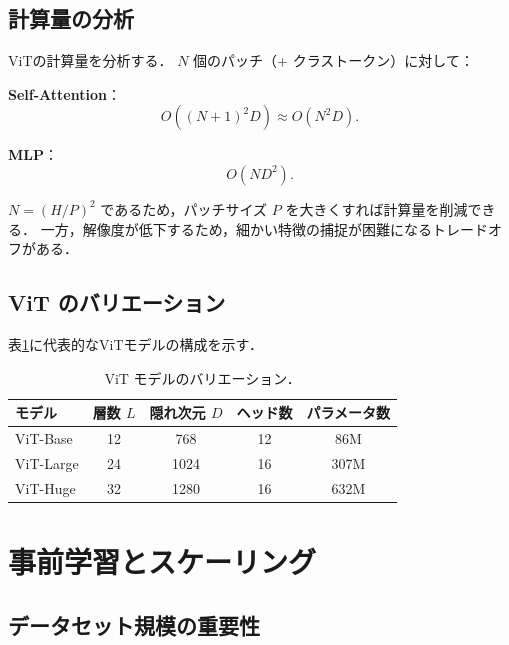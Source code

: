 \subsection{計算量の分析}

ViTの計算量を分析する．
$N$ 個のパッチ（+ クラストークン）に対して：

\textbf{Self-Attention}：
\begin{equation}
  O((N+1)^2 D) \approx O(N^2 D).
\end{equation}

\textbf{MLP}：
\begin{equation}
  O(N D^2).
\end{equation}

$N = (H/P)^2$ であるため，パッチサイズ $P$ を大きくすれば計算量を削減できる．
一方，解像度が低下するため，細かい特徴の捕捉が困難になるトレードオフがある．

\subsection{ViT のバリエーション}

表\ref{tab:vit-variants}に代表的なViTモデルの構成を示す．

\begin{table}[hbtp]
  \centering
  \caption{ViT モデルのバリエーション．}
  \label{tab:vit-variants}
  \begin{tabular}{lcccc}
    \toprule
    モデル & 層数 $L$ & 隠れ次元 $D$ & ヘッド数 & パラメータ数 \\
    \midrule
    ViT-Base  & 12 & 768  & 12 & 86M \\
    ViT-Large & 24 & 1024 & 16 & 307M \\
    ViT-Huge  & 32 & 1280 & 16 & 632M \\
    \bottomrule
  \end{tabular}
\end{table}

\section{事前学習とスケーリング}
\label{sec:pretraining}

\subsection{データセット規模の重要性}


